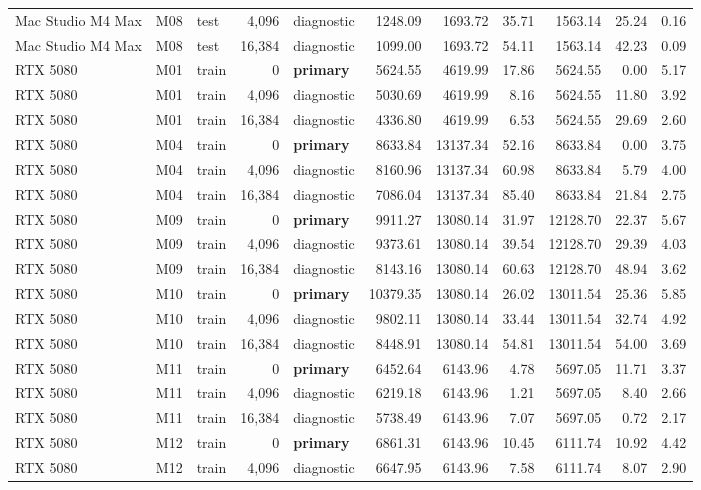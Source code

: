 \documentclass[10pt]{article}
\begin{document}
\begin{landscape}
\begin{longtable}{@{}l l l r l r r r r r r@{}}
Mac Studio M4 Max & M08 & test & 4,096 & diagnostic & 1248.09 & 1693.72 & 35.71 & 1563.14 & 25.24 & 0.16 \\
Mac Studio M4 Max & M08 & test & 16,384 & diagnostic & 1099.00 & 1693.72 & 54.11 & 1563.14 & 42.23 & 0.09 \\
RTX 5080 & M01 & train & 0 & \textbf{primary} & 5624.55 & 4619.99 & 17.86 & 5624.55 & 0.00 & 5.17 \\
RTX 5080 & M01 & train & 4,096 & diagnostic & 5030.69 & 4619.99 & 8.16 & 5624.55 & 11.80 & 3.92 \\
RTX 5080 & M01 & train & 16,384 & diagnostic & 4336.80 & 4619.99 & 6.53 & 5624.55 & 29.69 & 2.60 \\
RTX 5080 & M04 & train & 0 & \textbf{primary} & 8633.84 & 13137.34 & 52.16 & 8633.84 & 0.00 & 3.75 \\
RTX 5080 & M04 & train & 4,096 & diagnostic & 8160.96 & 13137.34 & 60.98 & 8633.84 & 5.79 & 4.00 \\
RTX 5080 & M04 & train & 16,384 & diagnostic & 7086.04 & 13137.34 & 85.40 & 8633.84 & 21.84 & 2.75 \\
RTX 5080 & M09 & train & 0 & \textbf{primary} & 9911.27 & 13080.14 & 31.97 & 12128.70 & 22.37 & 5.67 \\
RTX 5080 & M09 & train & 4,096 & diagnostic & 9373.61 & 13080.14 & 39.54 & 12128.70 & 29.39 & 4.03 \\
RTX 5080 & M09 & train & 16,384 & diagnostic & 8143.16 & 13080.14 & 60.63 & 12128.70 & 48.94 & 3.62 \\
RTX 5080 & M10 & train & 0 & \textbf{primary} & 10379.35 & 13080.14 & 26.02 & 13011.54 & 25.36 & 5.85 \\
RTX 5080 & M10 & train & 4,096 & diagnostic & 9802.11 & 13080.14 & 33.44 & 13011.54 & 32.74 & 4.92 \\
RTX 5080 & M10 & train & 16,384 & diagnostic & 8448.91 & 13080.14 & 54.81 & 13011.54 & 54.00 & 3.69 \\
RTX 5080 & M11 & train & 0 & \textbf{primary} & 6452.64 & 6143.96 & 4.78 & 5697.05 & 11.71 & 3.37 \\
RTX 5080 & M11 & train & 4,096 & diagnostic & 6219.18 & 6143.96 & 1.21 & 5697.05 & 8.40 & 2.66 \\
RTX 5080 & M11 & train & 16,384 & diagnostic & 5738.49 & 6143.96 & 7.07 & 5697.05 & 0.72 & 2.17 \\
RTX 5080 & M12 & train & 0 & \textbf{primary} & 6861.31 & 6143.96 & 10.45 & 6111.74 & 10.92 & 4.42 \\
RTX 5080 & M12 & train & 4,096 & diagnostic & 6647.95 & 6143.96 & 7.58 & 6111.74 & 8.07 & 2.90 \\

\end{longtable}
\end{landscape}
\end{document}
